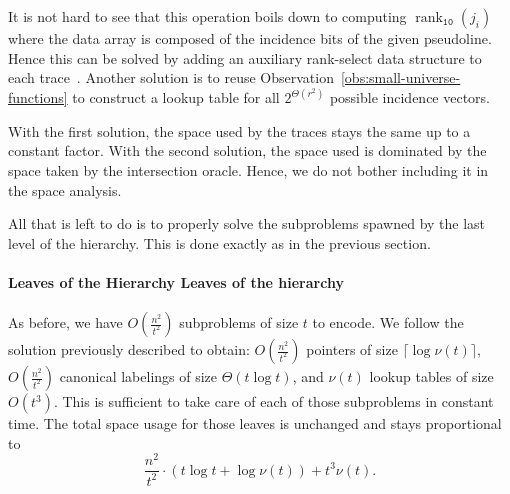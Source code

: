 It is not hard to see that this operation boils down to computing
\(\operatorname{rank}_{\texttt{10}}(j_i)\) where the data array is composed of
the incidence bits of the given pseudoline. Hence this can be solved by adding
an auxiliary rank-select data structure to each trace~\cite{RRS07,BH17}.
Another solution is to reuse Observation~\ref{obs:small-universe-functions} to
construct a lookup table for all \(2^{\Theta(r^2)}\) possible incidence
vectors.
%

With the first solution, the space used by the traces stays the same up to a
constant factor. With the second solution, the space used is dominated by the
space taken by the intersection oracle. Hence, we do not bother including it in
the space analysis.


All that is left to do is to properly solve the subproblems spawned by the last
level of the hierarchy. This is done exactly as in the previous section.
%
\paragraph*{\iftitlecase%
Leaves of the Hierarchy\else%
Leaves of the hierarchy\fi}
%
As before, we have \(O(\frac{n^2}{t^2})\) subproblems of size \(t\) to encode.
We follow the solution previously described to obtain:
\(O(\frac{n^2}{t^2})\) pointers of size \(\lceil \log{\nu(t)} \rceil\),
\(O(\frac{n^2}{t^2})\) canonical labelings of size \(\Theta(t \log t)\),
and \(\nu(t)\) lookup tables of size \(O(t^3)\).
%
This is sufficient to take care of each of those subproblems in constant time.
The total space usage for those leaves is unchanged and stays proportional to
\begin{displaymath}
  \frac{n^2}{t^2} \cdot (t \log t + \log{\nu(t)}) + t^3 \nu(t).
\end{displaymath}

